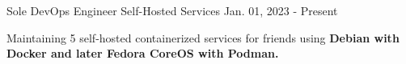 \begin{cventries}
    \cventry
    {Sole DevOps Engineer}
    {Self-Hosted Services}
    {}
    {Jan. 01, 2023 - Present}
    {
      \begin{cvitems}
        \item {Maintaining 5 self-hosted containerized services for friends using \textbf{Debian with Docker and later Fedora CoreOS with Podman.}}
      \end{cvitems}
    }
\end{cventries}
